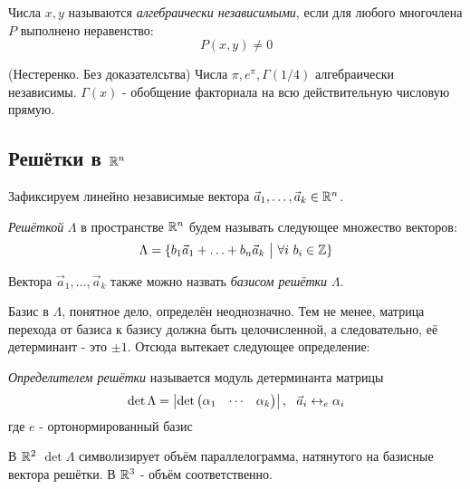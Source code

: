 \begin{definition}
	Числа $x, y$ называются \textit{алгебраически независимыми}, если для любого многочлена $P$ выполнено неравенство:
	\[
		P(x, y) \neq 0
	\]
\end{definition}

\begin{theorem} (Нестеренко. Без доказателсьтва)
	Числа $\pi, e^\pi, \Gamma(1/4)$ алгебраически независимы. $\Gamma(x)$ - обобщение факториала на всю действительную числовую прямую.
\end{theorem}

\subsection{Решётки в $\mathbb{R}^n$}

\begin{note}
	Зафиксируем линейно независимые вектора $\vec{a}_1, \ldots, \vec{a}_k \in \mathbb{R}^n$.
\end{note}

\begin{definition}
	\textit{Решёткой} $\Lambda$ в пространстве $\mathbb{R}^n$ будем называть следующее множество векторов:
	\[
		\Lambda = \{b_1\vec{a}_1 + \ldots + b_n\vec{a}_k \ \big|\  \forall i\ b_i \in \mathbb{Z}\}
	\]
\end{definition}

\begin{definition}
	Вектора $\vec{a}_1, \ldots, \vec{a}_k$ также можно назвать \textit{базисом решётки} $\Lambda$.
\end{definition}

\begin{note}
	Базис в $\Lambda$, понятное дело, определён неоднозначно. Тем не менее, матрица перехода от базиса к базису должна быть целочисленной, а следовательно, её детерминант - это $\pm 1$. Отсюда вытекает следующее определение:
\end{note}

\begin{definition}
	\textit{Определителем решётки} называется модуль детерминанта матрицы
	\[
		\det \Lambda = \left|\det \left(\begin{aligned}\alpha_1 & &\cdots & &\alpha_k\end{aligned}\right)\right|,\ \ \vec{a}_i \leftrightarrow_e \alpha_i
	\]
	где $e$ - ортонормированный базис
\end{definition}

\begin{note}
	В $\mathbb{R}^2$ $\det \Lambda$ символизирует объём параллелограмма, натянутого на базисные вектора решётки. В $\mathbb{R}^3$ - объём соответственно.
\end{note}

